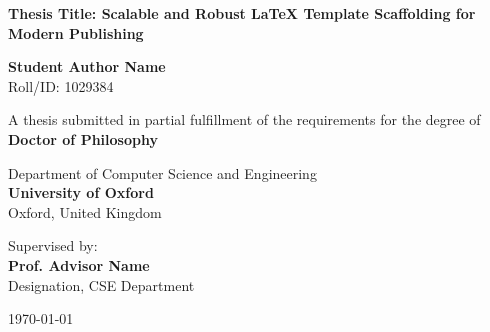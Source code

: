 \begin{titlepage}
\begin{center}
    \vspace*{1cm}
    
    
    \vspace{1.5cm}
    
    {\huge \bfseries \color{primary} Thesis Title: Scalable and Robust LaTeX Template Scaffolding for Modern Publishing}
    
    \vspace{1.5cm}
    
    {\Large \bfseries Student Author Name} \\
    \vspace{0.2cm}
    {Roll/ID: 1029384}
    
    \vspace{1.5cm}
    
    {A thesis submitted in partial fulfillment of the requirements for the degree of} \\
    \vspace{0.3cm}
    {\large \bfseries \color{secondary} Doctor of Philosophy}
    
    \vspace{1.5cm}
    
    {\large Department of Computer Science and Engineering} \\
    \vspace{0.2cm}
    {\large \bfseries \color{primary} University of Oxford} \\
    \vspace{0.1cm}
    {Oxford, United Kingdom}
    
    \vfill
    
    {Supervised by:} \\
    {\large \bfseries Prof. Advisor Name} \\
    {Designation, CSE Department}
    
    \vspace{1cm}
    
    {\large \today}
    
\end{center}
\end{titlepage}
